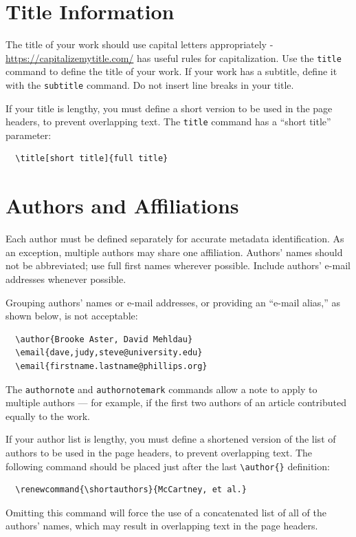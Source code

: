 \documentclass[review]{jair}
\begin{document}
\section{Title Information}

The title of your work should use capital letters appropriately -
\url{https://capitalizemytitle.com/} has useful rules for
capitalization. Use the {\verb|title|} command to define the title of
your work. If your work has a subtitle, define it with the
{\verb|subtitle|} command.  Do not insert line breaks in your title.

If your title is lengthy, you must define a short version to be used
in the page headers, to prevent overlapping text. The \verb|title|
command has a ``short title'' parameter:
\begin{verbatim}
  \title[short title]{full title}
\end{verbatim}

\section{Authors and Affiliations}

Each author must be defined separately for accurate metadata
identification.  As an exception, multiple authors may share one
affiliation. Authors' names should not be abbreviated; use full first
names wherever possible. Include authors' e-mail addresses whenever
possible.

Grouping authors' names or e-mail addresses, or providing an ``e-mail
alias,'' as shown below, is not acceptable:
\begin{verbatim}
  \author{Brooke Aster, David Mehldau}
  \email{dave,judy,steve@university.edu}
  \email{firstname.lastname@phillips.org}
\end{verbatim}

The \verb|authornote| and \verb|authornotemark| commands allow a note
to apply to multiple authors --- for example, if the first two authors
of an article contributed equally to the work.

If your author list is lengthy, you must define a shortened version of
the list of authors to be used in the page headers, to prevent
overlapping text. The following command should be placed just after
the last \verb|\author{}| definition:
\begin{verbatim}
  \renewcommand{\shortauthors}{McCartney, et al.}
\end{verbatim}
Omitting this command will force the use of a concatenated list of all
of the authors' names, which may result in overlapping text in the
page headers.
\end{document}

